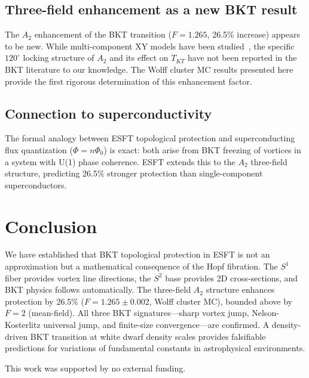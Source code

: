 ﻿\documentclass[twocolumn,showpacs,preprintnumbers,amsmath,amssymb,prd]{revtex4-2}
\begin{document}
\subsection{Three-field enhancement as a new BKT result}

The $A_2$ enhancement of the BKT transition ($F = 1.265$, 26.5\% increase) appears to be new. While multi-component XY models have been studied~\cite{Babaev2002}, the specific $120^\circ$ locking structure of $A_2$ and its effect on $T_{KT}$ have not been reported in the BKT literature to our knowledge. The Wolff cluster MC results presented here provide the first rigorous determination of this enhancement factor.

\subsection{Connection to superconductivity}

The formal analogy between ESFT topological protection and superconducting flux quantization ($\Phi = n\Phi_0$) is exact: both arise from BKT freezing of vortices in a system with U(1) phase coherence. ESFT extends this to the $A_2$ three-field structure, predicting 26.5\% stronger protection than single-component superconductors.

\section{Conclusion}

We have established that BKT topological protection in ESFT is not an approximation but a mathematical consequence of the Hopf fibration. The $S^1$ fiber provides vortex line directions, the $S^2$ base provides 2D cross-sections, and BKT physics follows automatically. The three-field $A_2$ structure enhances protection by 26.5\% ($F = 1.265 \pm 0.002$, Wolff cluster MC), bounded above by $F = 2$ (mean-field). All three BKT signatures---sharp vortex jump, Nelson-Kosterlitz universal jump, and finite-size convergence---are confirmed. A density-driven BKT transition at white dwarf density scales provides falsifiable predictions for variations of fundamental constants in astrophysical environments.

\begin{acknowledgments}
This work was supported by no external funding. \end{acknowledgments}
\end{document}
